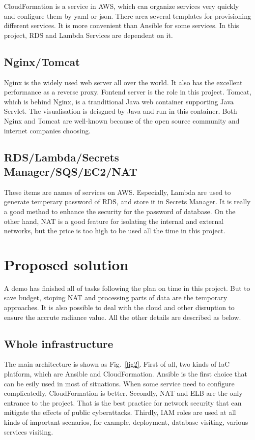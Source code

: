 \documentclass[conference]{IEEEtran}
\begin{document}
CloudFormation is a service in AWS, which can organize services very quickly and configure them by yaml or json. There area
several templates for provisioning different services. It is more convenient than Ansible for some services. In this project, 
RDS and Lambda Services are dependent on it.

\subsection{Nginx/Tomcat}

Nginx is the widely used web server all over the world. It also has the excellent performance as a reverse proxy. 
Fontend server is the role in this project. Tomcat, which is behind Nginx, is a tranditional Java web container supporting 
Java Servlet. The visualisation is deisgned by Java and run in this container. Both Nginx and Tomcat are well-known because of 
the open source community and internet companies choosing.

\subsection{RDS/Lambda/Secrets Manager/SQS/EC2/NAT}

These items are names of services on AWS. Especially, Lambda are used to generate temperary password of RDS, and store it in 
Secrets Manager. It is really a good method to enhance the security for the password of database. On the other hand, NAT is a 
good feature for isolating the internal and external networks, but the price is too high to be used all the time in this project.

\section{Proposed solution}

A demo has finished all of tasks following the plan on time in this project. But to save budget, stoping NAT and processing parts of data are 
the temporary approaches. It is also possible to deal with the cloud and other disruption to ensure the accrute radiance value. All the 
other details are described as below.

\subsection{Whole infrastructure}

The main architecture is shown as Fig.~\ref{fig2}. First of all, two kinds of IaC platform, which are Ansible and CloudFormation.
Ansible is the first choice that can be esily used in most of situations. When some service need to configure complicatedly, CloudFormation is 
better. Secondly, NAT and ELB are the only entrance to the project. That is the best practice for network security that can mitigate the effects 
of public cyberattacks. Thirdly, IAM roles are used at all kinds of important scenarios, for example, deployment, database visiting, various services visiting.
\end{document}
